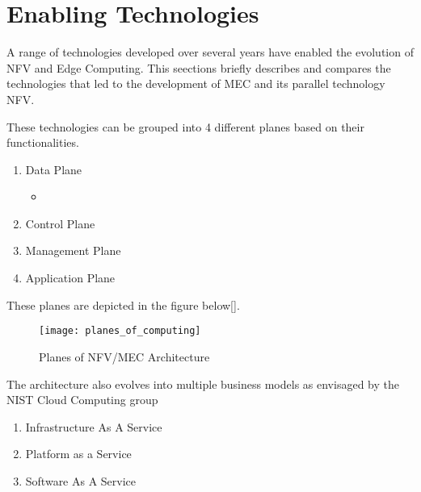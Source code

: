 \section{Enabling Technologies}

A range of technologies developed over several years have enabled the evolution of NFV and Edge Computing. This seections briefly describes and compares the technologies that led to the development of MEC and its parallel technology NFV.

These technologies can be grouped into 4 different planes based on their functionalities.

\begin{enumerate}
    \item Data Plane
	\begin{itemize}
	    \item
        \end{itemize}
    \item Control Plane
	\begin{itemize}
        \end{itemize}
    \item Management Plane
	\begin{itemize}
	\end{itemize}
    \item Application Plane
	\begin{itemize}
	\end{itemize}
\end{enumerate}

These planes are depicted in the figure below[].

\begin{figure}
	\centering
        \texttt{[image: planes\_of\_computing]}
	\label{fig:figure6}
	\caption{Planes of NFV/MEC Architecture}
\end{figure}

The architecture also evolves into multiple business models as envisaged by the NIST Cloud Computing group

\begin{enumerate}
    \item Infrastructure As A Service
    \item Platform as a Service
    \item Software As A Service
\end{enumerate}
